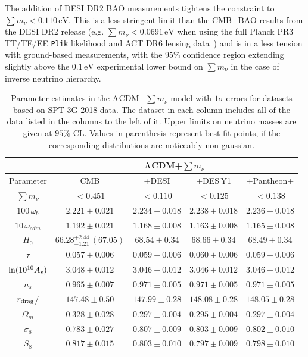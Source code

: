 \documentclass[12pt,a4paper]{article}
\newcommand{\rdrag}{r_{\rm drag}}
\newcommand{\eV}{\,\text{eV}}
\newcommand\?{/\hspace{0pt}}
\def\Mnu{\sum m_\nu}
\begin{document}
The addition of DESI DR2 BAO measurements tightens the constraint to $\Mnu < 0.110 \eV$. This is a less stringent limit than the CMB+BAO results from the DESI DR2 release (e.g. $\Mnu < 0.0691 \eV$ when using the full Planck PR3 TT/TE/EE \texttt{Plik} likelihood and ACT DR6 lensing data~\cite{DESI:2025zgx}) and is in a less tension with ground-based measurements, with the $95\%$ confidence region extending slightly above the $0.1\eV$ experimental lower bound on $\Mnu$ in the case of inverse neutrino hierarchy.

\begin{table}
	\renewcommand{\arraystretch}{1.2}
    \small
	\centering
	\begin{tabular} {|c|| c |c | c |c|}
		\hline
		& \multicolumn{4}{c|}{$\rm \Lambda$CDM+$\sum m_\nu$} \\
		\hline
		\hline
		Parameter & CMB & +DESI & +DES\,Y1 & +Pantheon+ \\
		\hline
        $\Mnu$ & $<0.451$ &
		$<0.110$ &
		$<0.125$ &
        $<0.138$ \\ 
		$100\,\omega_b$ & $2.221\pm0.021$ &
		$2.234\pm0.018$ &
		$2.238\pm0.018$ &
		$2.236\pm0.018$  \\ %
		$10\,\omega_{cdm}$ & $1.192\pm0.021$ &
		$1.168\pm0.008$ &
		$1.163\pm0.008$ &
		$1.165\pm0.008$ \\ %
		$H_0$ & $66.28^{+2.44}_{-1.21}\,(67.05)$ &
		$68.54\pm0.34$ &
		$68.66\pm0.34$ &
		$68.49\pm0.34$ \\
		$\tau$ & $0.057\pm0.006$ &
		$0.059\pm0.006$ &
		$0.060\pm0.006$ &
		$0.059\pm0.006$ \\ %
		$\!{\rm ln}(10^{10} A_s)\!$ & $3.048\pm0.012$ &
		$3.046\pm0.012$ &
		$3.046\pm0.012$ &
		$3.046\pm0.012$ \\ %
		$n_s$ & $0.965\pm0.007$ &
		$0.971\pm0.005$ &
		$0.971\pm0.005$ &
		$0.971\pm0.005$ \\ %
		\hline   
		$\rdrag$/\text{Mpc} & $147.48\pm0.50$ &
		$147.99\pm0.28$ &
		$148.08\pm0.28$ &
		$148.05\pm0.28$ \\    %
		$\Omega_m$ & $0.328\pm0.028$ &
		$0.297\pm0.004$ &
		$0.295\pm0.004$ &
		$0.297\pm0.004$ \\ %
		$\sigma_8$ & $0.783\pm0.027$ &
		$0.807\pm0.009$ &
		$0.803\pm0.009$ &
		$0.802\pm0.010$ \\ %
		$S_8$ & $0.817\pm0.015$ &
		$0.803\pm0.010$ &
		$0.797\pm0.009$ &
		$0.798\pm0.010$ \\
		\hline
	\end{tabular}
	\caption {Parameter estimates  in the $\rm \Lambda$CDM+$\sum m_\nu$ model with $1\sigma$ errors for datasets based on SPT-3G 2018 data. The dataset in each column includes all of the data listed in the columns to the left of it. Upper limits on neutrino masses are given at $95\%$ CL. Values in parenthesis represent best-fit points, if the corresponding distributions are noticeably non-gaussian.}
	\label{tab:3}
\end{table}
\end{document}

